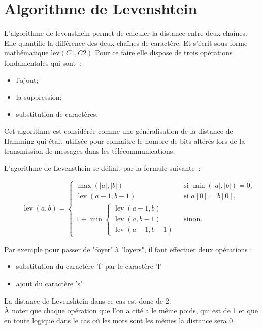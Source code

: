 \documentclass[final, 10pt]{report}
\begin{document}
\section{Algorithme de Levenshtein}

    L'algorithme de levensthein permet de calculer la distance entre deux chaînes.
    Elle quantifie la différence des deux chaînes de caractère. Et s'écrit sous forme mathématique $\text{lev}(C1,C2)$
    Pour ce faire elle dispose de trois opérations fondamentales qui sont~:
    \begin{itemize}
        \item l'ajout;
        \item la suppression;
        \item substitution de caractères.
    \end{itemize}
    
    \medskip
    Cet algorithme est considérée comme une généralisation de la distance de Hamming\cite{noauthor_distance_2021-1} qui était utilisée pour connaître le nombre de bits altérés lors de la transmission de messages dans les télécommunications.
    
    L'agorithme de Levensthein se définit par la formule suivante~:
    
    $$
    {\displaystyle \qquad \operatorname {lev} (a,b)={\begin{cases}\max(|a|,|b|)&{\text{ si }}\min(|a|,|b|)=0,\\\operatorname {lev} (a-1,b-1)&{\text{ si }}a[0]=b[0],\\1+\min {\begin{cases}\operatorname {lev} (a-1,b)\\\operatorname {lev} (a,b-1)\\\operatorname {lev} (a-1,b-1)\end{cases}}&{\text{ sinon.}}\end{cases}}}
     $$



Par exemple pour passer de "foyer" à "loyers", il faut effectuer deux opérations :
\begin{itemize}
    \item substitution du caractère 'f' par le caractère 'l'
    \item ajout du caractère 's'
\end{itemize}
La distance de Levenshtein dans ce cas est donc de 2.\\

À noter que chaque opération que l'on a cité a le même poids, qui est de 1 et que en toute logique dans le cas où les mots sont les mêmes la distance sera 0.\\
\end{document}
